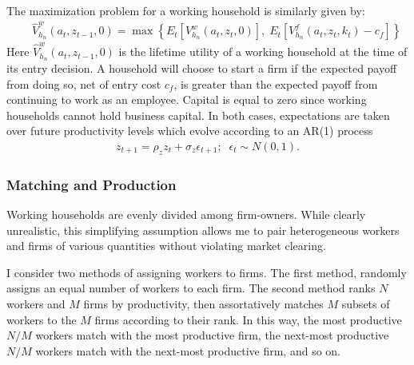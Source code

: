 \documentclass[11pt]{article}
\theoremstyle{definition}
\numberwithin{equation}{section}
\begin{document}
The maximization problem for a working household is similarly given by:
\begin{eqnarray}
&& \hat{V}^w_{h_n}(a_t,z_{t-1},0)=\max\left\{ E_t\left[ V^w_{h_n}(a_t,z_t,0) \right],\; E_t\left[ V^f_{h_n}(a_t,z_t,k_t)-c_f\right]\right\} 
\end{eqnarray}
Here $\hat{V}^w_{h_n}(a_t,z_{t-1},0)$ is the lifetime utility of a working household at the time of its entry decision. A household will choose to start a firm if the expected payoff from doing so, net of entry cost $c_f$, is greater than the expected payoff from continuing to work as an employee. Capital is equal to zero since working households cannot hold business capital. In both cases, expectations are taken over future productivity levels which evolve according to an AR(1) process
\begin{eqnarray}
z_{t+1} = \rho_z z_t + \sigma_z\epsilon_{t+1}; \;\; \epsilon_t\sim N(0,1). 
\end{eqnarray}


\subsubsection{Matching and Production}
Working households are evenly divided among firm-owners. While clearly unrealistic, this simplifying assumption allows me to pair heterogeneous workers and firms of various quantities without violating market clearing. 

I consider two methods of assigning workers to firms. The first method, randomly assigns an equal number of workers to each firm. The second method ranks $N$ workers and $M$ firms by productivity, then assortatively matches $M$ subsets of workers to the $M$ firms according to their rank. In this way, the most productive $N/M$ workers match with the most productive firm, the next-most productive $N/M$ workers match with the next-most productive firm, and so on. 
\end{document}
